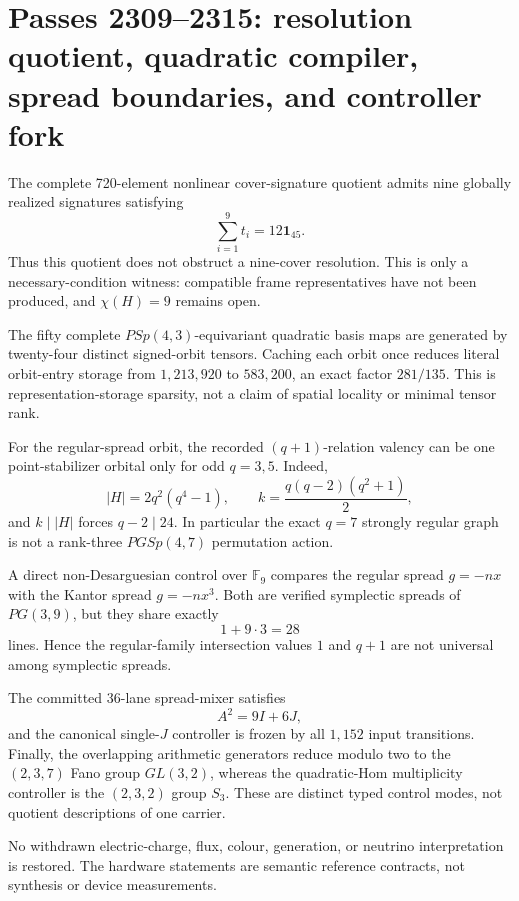 \section*{Passes 2309--2315: resolution quotient, quadratic compiler, spread boundaries, and controller fork}

The complete 720-element nonlinear cover-signature quotient admits nine globally realized signatures satisfying
\[
  \sum_{i=1}^{9}t_i=12\mathbf 1_{45}.
\]
Thus this quotient does not obstruct a nine-cover resolution.  This is only a necessary-condition witness: compatible frame representatives have not been produced, and $\chi(H)=9$ remains open.

The fifty complete $PSp(4,3)$-equivariant quadratic basis maps are generated by twenty-four distinct signed-orbit tensors.  Caching each orbit once reduces literal orbit-entry storage from $1{,}213{,}920$ to $583{,}200$, an exact factor $281/135$.  This is representation-storage sparsity, not a claim of spatial locality or minimal tensor rank.

For the regular-spread orbit, the recorded $(q+1)$-relation valency can be one point-stabilizer orbital only for odd $q=3,5$.  Indeed,
\[
 |H|=2q^2(q^4-1),\qquad
 k=\frac{q(q-2)(q^2+1)}2,
\]
and $k\mid |H|$ forces $q-2\mid24$.  In particular the exact $q=7$ strongly regular graph is not a rank-three $PGSp(4,7)$ permutation action.

A direct non-Desarguesian control over $\mathbb F_9$ compares the regular spread $g=-nx$ with the Kantor spread $g=-nx^3$.  Both are verified symplectic spreads of $PG(3,9)$, but they share exactly
\[
 1+9\cdot3=28
\]
lines.  Hence the regular-family intersection values $1$ and $q+1$ are not universal among symplectic spreads.

The committed 36-lane spread-mixer satisfies
\[
 A^2=9I+6J,
\]
and the canonical single-$J$ controller is frozen by all $1{,}152$ input transitions.  Finally, the overlapping arithmetic generators reduce modulo two to the $(2,3,7)$ Fano group $GL(3,2)$, whereas the quadratic-Hom multiplicity controller is the $(2,3,2)$ group $S_3$.  These are distinct typed control modes, not quotient descriptions of one carrier.

No withdrawn electric-charge, flux, colour, generation, or neutrino interpretation is restored.  The hardware statements are semantic reference contracts, not synthesis or device measurements.
